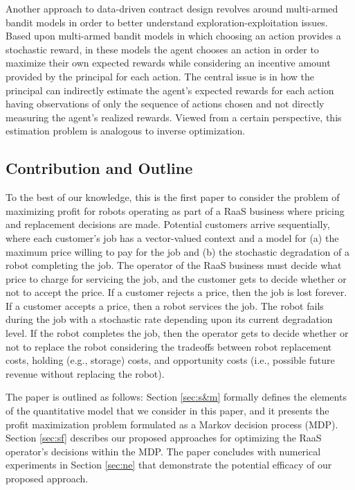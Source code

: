 \documentclass[conference]{IEEEtran}
\begin{document}
Another approach to data-driven contract design revolves around multi-armed bandit models \cite{dogan2023estimating,dogan2023repeated,scheid2024incentivized} in order to better understand exploration-exploitation issues. Based upon multi-armed bandit models in which choosing an action provides a stochastic reward, in these models the agent chooses an action in order to maximize their own expected rewards while considering an incentive amount provided by the principal for each action. The central issue is in how the principal can indirectly estimate the agent's expected rewards for each action having observations of only the sequence of actions chosen and not directly measuring the agent's realized rewards. Viewed from a certain perspective, this estimation problem is analogous to inverse optimization. 

\subsection{Contribution and Outline}

To the best of our knowledge, this is the first paper to consider the problem of maximizing profit for robots operating as part of a RaaS business where pricing and replacement decisions are made. Potential customers arrive sequentially, where each customer's job has a vector-valued context and a model for (a) the maximum price willing to pay for the job and (b) the stochastic degradation of a robot completing the job. The operator of the RaaS business must decide what price to charge for servicing the job, and the customer gets to decide whether or not to accept the price. If a customer rejects a price, then the job is lost forever. If a customer accepts a price, then a robot services the job. The robot fails during the job with a stochastic rate depending upon its current degradation level. If the robot completes the job, then the operator gets to decide whether or not to replace the robot considering the tradeoffs between robot replacement costs, holding (e.g., storage) costs, and opportunity costs (i.e., possible future revenue without replacing the robot). 

The paper is outlined as follows: Section \ref{sec:s&m} formally defines the elements of the quantitative model that we consider in this paper, and it presents the profit maximization problem formulated as a Markov decision process (MDP). Section \ref{sec:sf} describes our proposed approaches for optimizing the RaaS operator's decisions within the MDP. The paper concludes with numerical experiments in Section \ref{sec:ne} that demonstrate the potential efficacy of our proposed approach.
\end{document}
